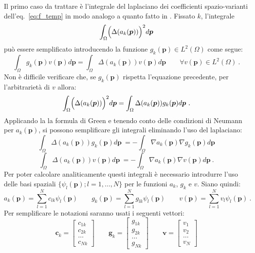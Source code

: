 \documentclass[a4paper,11pt,twoside,openright]{book}							%
\begin{document}
Il primo caso da trattare è l'integrale del laplaciano dei coefficienti spazio-varianti dell'eq.~\ref{eq:f_temp} in modo analogo a quanto fatto in \cite{art:sangalli}. Fissato $k$, l'integrale
$$
\int_{\Omega} \Bigl( \Delta(  a_k(\bm p)  ) \Bigr)^2 d \bm p
$$
può essere semplificato introducendo la funzione $g_k(\bm p) \in L^2(\Omega)$ come segue:
\begin{equation}
\label{eq:ps1}
\int_\Omega g_k(\bm{p}) v(\bm{p}) d \bm{p}= \int_\Omega \Delta (a_k(\bm p)) v(\bm p) d \bm{p}\qquad \forall v(\bm{p}) \in L^2(\Omega) \ .
\end{equation}
Non è difficile verificare che, se $g_k(\bm p)$ rispetta l'equazione precedente, per l'arbitrarietà di $v$ allora:
\begin{equation}
\label{eq:ps2}
\int_{\Omega} \Bigl( \Delta(  a_k(\bm p)  ) \Bigr)^2 d \bm p = \int_{\Omega}  \Delta(  a_k(\bm p))g_k(\bm p)d \bm p \ .
\end{equation}
Applicando la la formula di Green e tenendo conto delle condizioni di Neumann per $a_k(\bm p)$, si possono semplificare gli integrali eliminando l'uso del laplaciano:
$$
\int_{\Omega}  \Delta(  a_k(\bm p))g_k(\bm p)d \bm p \ = -\int_{\Omega} \nabla  a_k(\bm p)\nabla g_k(\bm p)d \bm p
$$
$$
\int_{\Omega}  \Delta(  a_k(\bm p))v(\bm p)d \bm p \ = -\int_{\Omega} \nabla  a_k(\bm p)\nabla v(\bm p)d \bm p \ .
$$
Per poter calcolare analiticamente questi integrali è necessario introdurre l'uso delle basi spaziali $\{ \psi_l(\bm p);l=1, \ldots , N \}$ per le funzioni $a_k$, $g_k$ e $v$. Siano quindi:
$$
a_k(\bm p)=\sum_{l=1}^N c_{lk}\psi_l(\bm p) \qquad 
g_k(\bm p)=\sum_{l=1}^N g_{lk}\psi_l(\bm p) \qquad
v(\bm p)=\sum_{l=1}^N v_{l}\psi_l(\bm p) \ .
$$
Per semplificare le notazioni saranno usati i seguenti vettori:
$$
\bm c_k =
\begin{bmatrix}
c_{1k} \\ c_{2k} \\ \hdots \\ c_{Nk}
\end{bmatrix}
\qquad
\bm g_k =
\begin{bmatrix}
g_{1k} \\ g_{2k} \\ \hdots \\ g_{Nk}
\end{bmatrix}
\qquad
\bm v =
\begin{bmatrix}
v_1 \\ v_2 \\ \hdots \\ v_N
\end{bmatrix} 
$$
\end{document}
